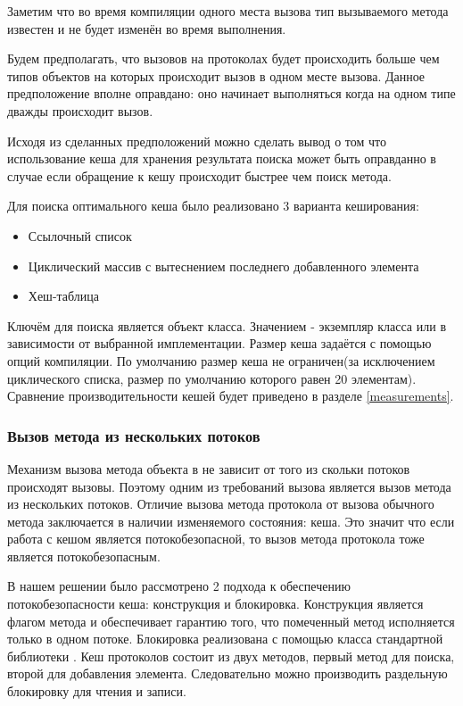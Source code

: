 Заметим что во время компиляции одного места вызова тип вызываемого метода известен и не будет изменён во время выполнения.

Будем предполагать, что вызовов на протоколах будет происходить больше чем типов объектов на которых происходит вызов в одном месте вызова. Данное предположение вполне оправдано: оно начинает выполняться когда на одном типе дважды происходит вызов.

Исходя из сделанных предположений можно сделать вывод о том что использование кеша для хранения результата поиска может быть оправданно в случае если обращение к кешу происходит быстрее чем поиск метода.

Для поиска оптимального кеша было реализовано 3 варианта кеширования:
\begin{itemize}
  \item Ссылочный список
  \item Циклический массив с вытеснением последнего добавленного элемента
  \item Хеш-таблица
\end{itemize}

Ключём для поиска является объект класса. Значением - экземпляр класса  или  в зависимости от выбранной имплементации. Размер кеша задаётся с помощью опций компиляции. По умолчанию размер кеша не ограничен(за исключением циклического списка, размер по умолчанию которого равен 20 элементам). Сравнение производительности кешей будет приведено в разделе \ref{measurements}.

\subsubsection{Вызов метода из нескольких потоков}
Механизм вызова метода объекта в  не зависит от того из скольки потоков происходят вызовы. Поэтому одним из требований вызова является вызов метода из нескольких потоков. Отличие вызова метода протокола от вызова обычного метода заключается в наличии изменяемого состояния: кеша. Это значит что если работа с кешом является потокобезопасной, то вызов метода протокола тоже является потокобезопасным.

В нашем решении было рассмотрено 2 подхода к обеспечению потокобезопасности кеша:  конструкция и  блокировка. Конструкция  является флагом метода и обеспечивает гарантию того, что помеченный метод исполняется только в одном потоке. Блокировка  реализована с помощью класса стандартной библиотеки \cite{jvm:rwlock}. Кеш протоколов состоит из двух методов, первый метод для поиска, второй для добавления элемента. Следовательно можно производить раздельную блокировку для чтения и записи.

